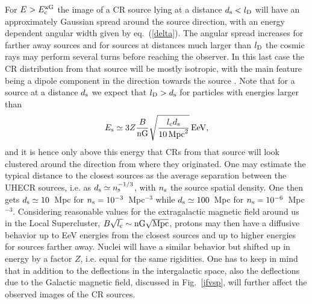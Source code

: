 \documentclass[twoside,12pt]{article}
\begin{document}
For $E>E_{\rm c}^{\rm xG}$ the image of a CR source lying at a distance $d_{\rm s}<l_{\rm D}$ 
will have an approximately Gaussian spread around the source direction, with an energy dependent angular width given by eq.~(\ref{delta}). The angular spread increases for farther away sources and 
for sources at distances much larger than $l_{\rm D}$ the cosmic rays may perform several turns before reaching the observer. In this last case the CR distribution from that source will be mostly isotropic, with the main feature being a dipole component in the direction towards the source \cite{hmr16}. 
Note that for a source at a distance $d_{\rm s}$ we expect that $l_{\rm D} > d_{\rm s}$ for particles with energies larger than
\begin{equation}
E_{\rm s} \simeq 3 Z  \frac{B}{\rm nG}\sqrt{\frac{l_{\rm c} d_{\rm s}}{10\, {\rm Mpc}^2}}\,{\rm EeV},
\end{equation}
and it is hence only above this energy that CRs from that source will look clustered around the  direction from where they originated.
One may estimate the typical distance to the closest sources  as the average separation between the UHECR sources, i.e. as $d_{\rm s} \simeq n_{\rm s}^{-1/3}$, with  $n_{\rm s}$ the source spatial density. One then gets  $d_{\rm s} \simeq 10$~Mpc for $n_{\rm s} = 10^{-3}$~Mpc$^{-3}$ while $d_{\rm s} \simeq 100$~Mpc for $n_{\rm s} = 10^{-6}$~Mpc$^{-3}$. Considering reasonable values for the extragalactic magnetic field around us in the Local Supercluster, $B\sqrt{l_{\rm c}}\sim {\rm nG}\sqrt{\rm Mpc}$,  protons may then have a diffusive behavior up to EeV energies  from the closest sources and up to higher energies for sources farther away. Nuclei will have a similar behavior but shifted up in energy by a factor $Z$, i.e. equal for the same rigidities.
One has to keep in mind that in addition to the deflections in the intergalactic space, also the deflections due to the Galactic magnetic field, discussed in Fig.~\ref{jfvsp}, will further affect the observed images of the CR sources.
\end{document}
